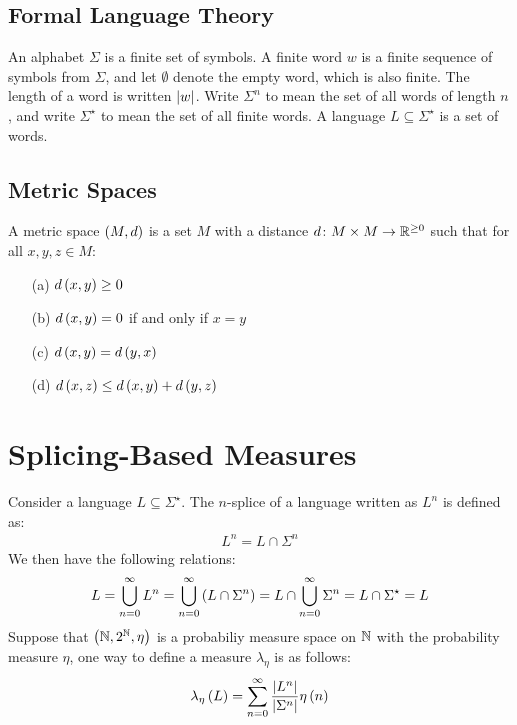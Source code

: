 \documentclass[12pt]{article}
\begin{document}
\subsection{Formal Language Theory}
An alphabet \(\Sigma\) is a finite set of symbols.
A finite word \(w\) is a finite sequence of symbols from \(\Sigma\),
and let \(\emptyset\) denote the empty word, which is also finite.
The length of a word is written \(\left\lvert w\right\rvert\).
Write \(\Sigma^n\) to mean the set of all words of length \(n\),
and write \(\Sigma^\star\) to mean the set of all finite words.
A language \(L \subseteq \Sigma^\star\) is a set of words.


\subsection{Metric Spaces}
A metric space \(\left(M, d\right)\) is a set \(M\) with a distance
\(d \colon M \times M \to \mathbb{R}^{\geq 0}\) such that
for all \(x, y, z \in M\):
\begin{enumerate}
  \item[(a)]
    \(d\left(x, y\right) \geq 0\)

  \item[(b)]
    \(d\left(x, y\right) = 0\) if and only if \(x = y\)

  \item[(c)]
    \(d\left(x, y\right) = d\left(y, x\right)\)

  \item[(d)]
    \(d\left(x, z\right) \leq d\left(x, y\right) + d\left(y, z\right)\)
\end{enumerate}


\section{Splicing-Based Measures}
Consider a language \(L \subseteq \Sigma^\star\).
The \(n\)-splice of a language written as \(L^n\) is defined as:
\begin{align*}
  L^n = L \cap \Sigma^n
\end{align*}
We then have the following relations:
\begin{align*}
  L
    = \bigcup_{n = 0}^{\infty} L^n
    = \bigcup_{n = 0}^{\infty} \left(L \cap \Sigma^n\right)
    = L \cap \bigcup_{n = 0}^{\infty} \Sigma^n
    = L \cap \Sigma^\star
    = L
\end{align*}
Suppose that \(\left(\mathbb{N}, 2^{\mathbb{N}}, \eta\right)\) is a probabiliy measure space
on \(\mathbb{N}\) with the probability measure \(\eta\),
one way to define a measure \(\lambda_{\eta}\)
is as follows:
\begin{align*}
  \lambda_{\eta} \left(L\right)
    = \sum_{n = 0}^{\infty}
        \frac{\left\lvert L^n\right\rvert}{\left\lvert\Sigma^n\right\rvert} \eta\left(n\right)
\end{align*}
\end{document}
